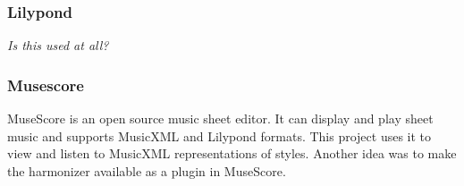 \subsubsection{Lilypond}
\label{sec:tools.lilypond}

\textit{Is this used at all?}

\subsubsection{Musescore}

MuseScore \cite{musescore} is an open source music sheet editor.
It can display and play sheet music and supports MusicXML and Lilypond formats.
This project uses it to view and listen to MusicXML representations of styles.
Another idea was to make the harmonizer available as a plugin in MuseScore.
